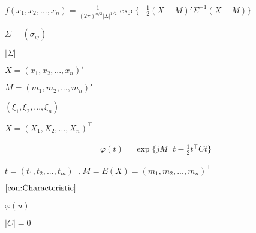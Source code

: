\begin{preview}
\setcounter{equation}{0}%
\(f(x_1, x_2, ..., x_n) = \frac{1}{(2\pi)^{n/2}\vert\Sigma\vert^{1/2}}\exp\{-\frac{1}{2}(X-M)'\Sigma^{-1}(X-M)\}\)
\end{preview}

\begin{preview}
\setcounter{equation}{0}%
\(\Sigma = (\sigma_{ij})\)
\end{preview}

\begin{preview}
\setcounter{equation}{0}%
\(\vert \Sigma \vert\)
\end{preview}

\begin{preview}
\setcounter{equation}{0}%
\(X = (x_1, x_2, ..., x_n)'\)
\end{preview}

\begin{preview}
\setcounter{equation}{0}%
\( M=(m_1, m_2, ..., m_n)'\)
\end{preview}

\begin{preview}
\setcounter{equation}{0}%
\((\xi_1, \xi_2, ..., \xi_n)\)
\end{preview}

\begin{preview}
\setcounter{equation}{0}%
\(X = (X_1, X_2, ..., X_n)^\top\)
\end{preview}

\begin{preview}
\setcounter{equation}{0}%
\begin{align}
  \varphi(t) = \exp\{jM^\top t-\frac{1}{2}t^\top C t\}\label{con:Characteristic}
\end{align}

\end{preview}

\begin{preview}
\setcounter{equation}{0}%
\(t = (t_1, t_2, ..., t_m)^\top , M = E(X) = (m_1, m_2, ..., m_n)^\top\)
\end{preview}

\begin{preview}
\setcounter{equation}{0}%
\(\ref{con:Characteristic}\)
\end{preview}

\begin{preview}
\setcounter{equation}{0}%
\(\varphi(u)\)
\end{preview}

\begin{preview}
\setcounter{equation}{0}%
\(\vert C \vert = 0\)
\end{preview}

